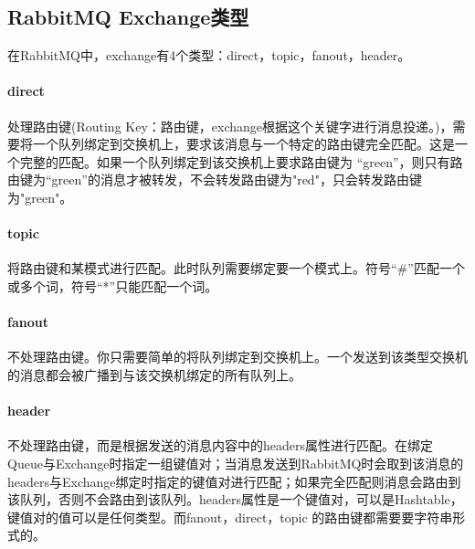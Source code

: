 \documentclass[../../../interview-questions.tex]{subfiles}
\begin{document}
\subsection{RabbitMQ Exchange类型}

在RabbitMQ中，exchange有4个类型：direct，topic，fanout，header。

\paragraph{direct}处理路由键(Routing Key：路由键，exchange根据这个关键字进行消息投递。)，需要将一个队列绑定到交换机上，要求该消息与一个特定的路由键完全匹配。这是一个完整的匹配。如果一个队列绑定到该交换机上要求路由键为 “green”，则只有路由键为“green”的消息才被转发，不会转发路由键为"red"，只会转发路由键为"green"。

\paragraph{topic}将路由键和某模式进行匹配。此时队列需要绑定要一个模式上。符号“\#”匹配一个或多个词，符号“*”只能匹配一个词。

\paragraph{fanout}不处理路由键。你只需要简单的将队列绑定到交换机上。一个发送到该类型交换机的消息都会被广播到与该交换机绑定的所有队列上。

\paragraph{header}不处理路由键，而是根据发送的消息内容中的headers属性进行匹配。在绑定Queue与Exchange时指定一组键值对；当消息发送到RabbitMQ时会取到该消息的headers与Exchange绑定时指定的键值对进行匹配；如果完全匹配则消息会路由到该队列，否则不会路由到该队列。headers属性是一个键值对，可以是Hashtable，键值对的值可以是任何类型。而fanout，direct，topic 的路由键都需要要字符串形式的。
\end{document}
